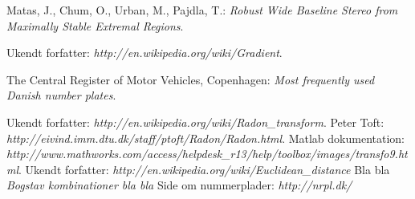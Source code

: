 \documentclass[11pt,a4paper,final]{article}
\begin{document}
\begin{thebibliography}{99}
 Matas, J., Chum, O., Urban, M., Pajdla, T.: \textit{Robust Wide Baseline Stereo from Maximally Stable Extremal Regions}.


 Ukendt forfatter: \textit{http://en.wikipedia.org/wiki/Gradient}.

 The Central Register of Motor Vehicles, Copenhagen: \textit{Most frequently used Danish number plates}.

 Ukendt forfatter: \textit{http://en.wikipedia.org/wiki/Radon\_transform}.
 Peter Toft: \textit{http://eivind.imm.dtu.dk/staff/ptoft/Radon/Radon.html}.
 Matlab dokumentation: \textit{http://www.mathworks.com/access/helpdesk\_r13/help/toolbox/images/transfo9.html}.
 Ukendt forfatter: \textit{http://en.wikipedia.org/wiki/Euclidean\_distance}
 Bla bla \textit{Bogstav kombinationer bla bla}
 Side om nummerplader: \textit{http://nrpl.dk/}


\end{thebibliography}

\appendix

\end{document}
